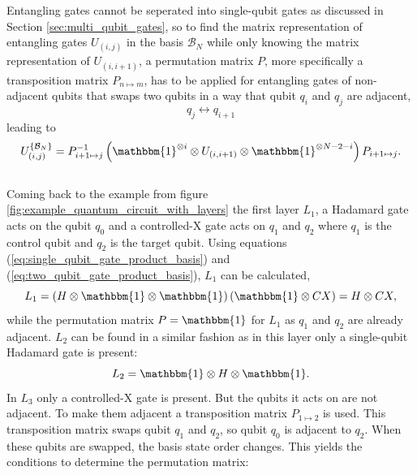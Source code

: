	Entangling gates cannot be seperated into single-qubit gates as discussed in Section \ref{sec:multi_qubit_gates}, so to find the matrix representation of entangling gates $U_{(i,j)}$ in the basis $\mathcal{B}_N$ while only knowing the matrix representation of $U_{(i,i+1)}$, a permutation matrix $P$, more specifically a transposition matrix $P_{n\mapsto m}$, has to be applied for entangling gates of non-adjacent qubits that swaps two qubits in a way that qubit $q_i$ and $q_j$ are adjacent,
	\begin{equation}
		\label{eq:qubit_swap}
		q_j\leftrightarrow q_{i+1}
	\end{equation}
	leading to
	\begin{equation}
		\label{eq:two_qubit_gate_product_basis}
		U^{\{\mathcal{B}_N\}}_{(i, j)}=P^{-1}_{i+1\mapsto j}\left(\mathbbm{1}^{\otimes i}\otimes U_{(i,i+1)}\otimes \mathbbm{1}^{\otimes N-2-i}\right)P_{i+1\mapsto j}.
	\end{equation}
	\\
	Coming back to the example from figure \ref{fig:example_quantum_circuit_with_layers} the first layer $L_1$, a Hadamard gate acts on the qubit $q_0$ and a controlled-X gate acts on $q_1$ and $q_2$ where $q_1$ is the control qubit and $q_2$ is the target qubit. Using equations (\ref{eq:single_qubit_gate_product_basis}) and (\ref{eq:two_qubit_gate_product_basis}), $L_1$ can be calculated,
	\begin{equation}
		\label{eq:example_circuit_layer1}
		L_1=\left(H\otimes \mathbbm{1}\otimes \mathbbm{1}\right)\left(\mathbbm{1}\otimes CX\right)=H\otimes CX,
	\end{equation}
	while the permutation matrix $P=\mathbbm{1}$ for $L_1$  as $q_1$ and $q_2$ are already adjacent.
	$L_2$ can be found in a similar fashion as in this layer only a single-qubit Hadamard gate is present:
	\begin{equation}
		\label{eq:example_circuit_layer2}
		L_2=\mathbbm{1}\otimes H\otimes\mathbbm{1}.
	\end{equation}
	In $L_3$ only a controlled-X gate is present. But the qubits it acts on are not adjacent. To make them adjacent a transposition matrix $P_{1\mapsto 2}$ is used. This transposition matrix swaps qubit $q_1$ and $q_2$, so qubit $q_0$ is adjacent to $q_2$. When these qubits are swapped, the basis state order changes. This yields the conditions to determine the permutation matrix:
